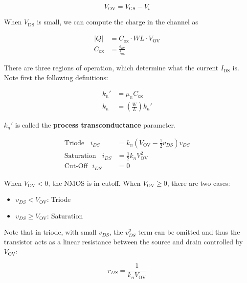 \documentclass[11pt]{report}
\begin{document}
 \begin{equation}
 	\label{eqn:overdrive-voltage}
 	V_\text{OV} = V_\text{GS} - V_t
 \end{equation}

When $V_\text{DS}$ is small, we can compute the charge in the channel as

\begin{align}
	\label{eqn:nmos-channel-charge}
	|Q| &= C_{\text{ox}} \cdot W L \cdot V_{\text{OV}} \\
	C_\text{ox} &= \frac{\epsilon_\text{ox}}{t_\text{ox}}
\end{align}

 There are three regions of operation, which determine what the current $I_{\text{DS}}$ is. Note first the following definitions:

 \begin{align}
 	\label{eqn:transconductance}
 	k_n' &= \mu_nC_\text{ox} \\
 	k_n &= \left(\frac{W}{L}\right)k_n'
 \end{align}

$k_n'$ is called the \textbf{process transconductance} parameter.

 \begin{align}
 	\label{eqn:nmos-regions-of-operation}
 	\text{Triode} \ \ \ \ i_{DS} &= k_n\left(V_{\text{OV}} - \frac{1}{2}v_{DS}\right)v_{DS}\\
 	\text{Saturation} \ \ \ \ i_{DS} &= \frac{1}{2}k_nV_{\text{OV}}^2\\
 	\text{Cut-Off} \ \ \ i_{DS} &= 0
 \end{align}

 When $V_{\text{OV}} < 0$, the NMOS is in cutoff. When $V_{\text{OV}} \ge 0$, there are two cases:

 \begin{itemize}
 	\item $v_{DS} < V_{\text{OV}}$: Triode
 	\item $v_{DS} \ge V_{\text{OV}}$: Saturation
 \end{itemize}

Note that in triode, with small $v_{DS}$, the $v_{DS}^2$ term can be omitted and thus the transistor acts as a linear resistance between the source and drain controlled by $V_{\text{OV}}$:

\begin{equation}
	\label{eqn:linear-resistance-nmos}
	r_{DS} = \frac{1}{k_nV_{\text{OV}}}
\end{equation}
\end{document}
